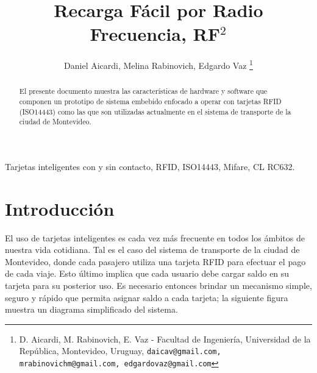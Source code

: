 \documentclass[%
        final,
        notitlepage,
        narroweqnarray,
        inline,
        ]{ieee}
\begin{document}
\title[RF$^{2}$]{%
       Recarga Fácil por Radio Frecuencia, RF$^{2}$}

\author[D. Aicardi, M. Rabinovich, E. Vaz]{Daniel Aicardi, Melina Rabinovich, Edgardo Vaz
	\thanks{D. Aicardi, M. Rabinovich, E. Vaz - Facultad de Ingeniería, Universidad de la República, Montevideo, Uruguay,
		{\tt\small daicav@gmail.com, mrabinovichm@gmail.com, edgardovaz@gmail.com} }
}





\maketitle               

\begin{abstract}
El presente documento muestra las características de hardware y software que componen un prototipo de sistema embebido enfocado a operar con tarjetas RFID (ISO14443) como las que son utilizadas actualmente en el sistema de transporte de la ciudad de Montevideo.
\end{abstract}


\begin{keywords}
Tarjetas inteligentes con y sin contacto, RFID, ISO14443, Mifare, CL RC632.
\end{keywords}

\section{Introducción}

\PARstart El uso de tarjetas inteligentes es cada vez más frecuente en todos los ámbitos de nuestra vida cotidiana. 
Tal es el caso del sistema de transporte de la ciudad de Montevideo, donde cada pasajero utiliza una tarjeta RFID 
para efectuar el pago de cada viaje. Esto último implica que cada usuario debe cargar saldo en su tarjeta para su 
posterior uso. Es necesario entonces brindar un mecanismo simple, seguro y rápido que permita asignar saldo a cada tarjeta; la siguiente figura muestra un diagrama simplificado del sistema.
\end{document}

